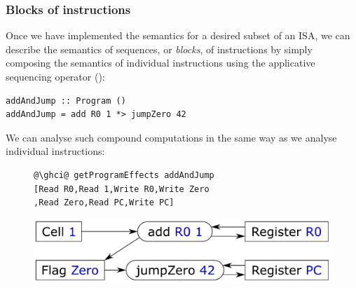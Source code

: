\subsubsection{Blocks of instructions}

Once we have implemented the semantics for a desired subset of an ISA, we can
describe the semantics of sequences, or \emph{blocks}, of instructions by
simply composing the semantics of individual instructions using the applicative
sequencing operator (\hs{*>}):

\vspace{1mm}
\begin{verbatim}
addAndJump :: Program ()
addAndJump = add R0 1 *> jumpZero 42
\end{verbatim}
\vspace{1mm}

\noindent
We can analyse such compound computations in the same way as we analyse
individual instructions:

\vspace{-1mm}
\begin{figure}[!h]
 \begin{minipage}{0.46\textwidth}
\raggedleft
\begin{verbatim}
@\ghci@ getProgramEffects addAndJump
[Read R0,Read 1,Write R0,Write Zero
,Read Zero,Read PC,Write PC]
\end{verbatim}
 \end{minipage}
 \begin{minipage}{0.50\textwidth}
  \centering
  \includegraphics[scale=0.3]{fig/addAndJump.pdf}
 \end{minipage}
\end{figure}
\vspace{-1mm}


